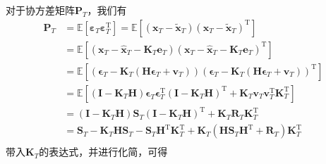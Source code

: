 对于协方差矩阵\( \mathbf{P}_T \)，我们有
\[
    \begin{split}
        \mathbf{P}_T & = \mathbb{E}[\bm{\varepsilon}_T \bm{\varepsilon}_T^{\mathrm{T}}] = \mathbb{E}[(\bm{x}_T - \tilde{\bm{x}}_T)(\bm{x}_T - \tilde{\bm{x}}_T)^{\mathrm{T}}]                                                                           \\
                     & = \mathbb{E}[(\bm{x}_T - \hat{\bm{x}}_T - \mathbf{K}_T \bm{e}_T)(\bm{x}_T - \hat{\bm{x}}_T - \mathbf{K}_T \bm{e}_T)^{\mathrm{T}}]                                                                                                \\
                     & = \mathbb{E}[(\bm{\epsilon}_T - \mathbf{K}_T (\mathbf{H} \bm{\epsilon}_T + \bm{v}_T))(\bm{\epsilon}_T - \mathbf{K}_T (\mathbf{H} \bm{\epsilon}_T + \bm{v}_T))^{\mathrm{T}}]                                                      \\
                     & = \mathbb{E}[(\mathbf{I} - \mathbf{K}_T \mathbf{H}) \bm{\epsilon}_T \bm{\epsilon}_T^{\mathrm{T}} (\mathbf{I} - \mathbf{K}_T \mathbf{H})^{\mathrm{T}} + \mathbf{K}_T \bm{v}_T \bm{v}_T^{\mathrm{T}} \mathbf{K}_T^{\mathrm{T}}]    \\
                     & = (\mathbf{I} - \mathbf{K}_T \mathbf{H}) \mathbf{S}_T (\mathbf{I} - \mathbf{K}_T \mathbf{H})^{\mathrm{T}} + \mathbf{K}_T \mathbf{R}_T \mathbf{K}_T^{\mathrm{T}}                                                                  \\
                     & = \mathbf{S}_T - \mathbf{K}_T \mathbf{H} \mathbf{S}_T - \mathbf{S}_T \mathbf{H}^{\mathrm{T}} \mathbf{K}_T^{\mathrm{T}} + \mathbf{K}_T (\mathbf{H} \mathbf{S}_T \mathbf{H}^{\mathrm{T}} + \mathbf{R}_T) \mathbf{K}_T^{\mathrm{T}} \\
    \end{split}
\]
带入\( \mathbf{K}_T \)的表达式，并进行化简，可得
